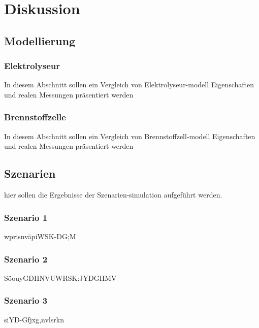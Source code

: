 \chapter{Diskussion}
\label{cha:Diskussion}

\section{Modellierung}
\label{sec:Sektion 1}

\subsection{Elektrolyseur}
\label{subsec:Abschnitt1}
In diesem Abschnitt sollen ein Vergleich von Elektrolyseur-modell Eigenschaften und realen Messungen präsentiert werden


\subsection{Brennstoffzelle}
In diesem Abschnitt sollen ein Vergleich von Brennstoffzell-modell Eigenschaften und realen Messungen präsentiert werden


\section{Szenarien}

hier sollen die Ergebnisse der Szenarien-simulation aufgeführt werden.

\subsection{Szenario 1}
wprisnväpiWSK-DG;M

\subsection{Szenario 2}
SöouyGDHNVUWRSK:JYDGHMV

\subsection{Szenario 3}
siYD-Gfjxg,nvlsrkn